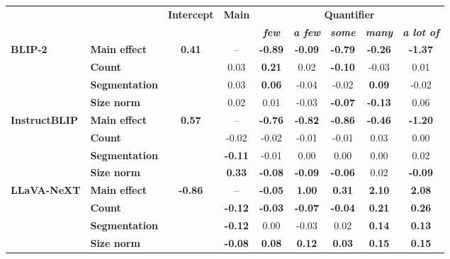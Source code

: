 \begin{table*}[t]
\centering
\small
\begin{tabular}{ll|c|c|ccccc}
\toprule
\multicolumn{2}{c|}{} 
    & \multirow{2}{*}{\textbf{Intercept}} 
    & \multirow{2}{*}{\textbf{Main}}
    & \multicolumn{5}{c}{\textbf{Quantifier}} \\
    &&&& \textbf{\textit{few}} & \textbf{\textit{a few}} & \textbf{\textit{some}} & \textbf{\textit{many}} & \textbf{\textit{a lot of}} \\
    \midrule

\multirow{4}{*}{\textbf{BLIP-2}}
    & \textbf{Main effect} & \multirow{4}{*}{\textbf{0.41}} & -- & \textbf{-0.89} & \textbf{-0.09} & \textbf{-0.79} & \textbf{-0.26} & \textbf{-1.37} \\
    & \textbf{Count}        && 0.03 & \textbf{0.21} & 0.02 & \textbf{-0.10} & -0.03 & 0.01 \\
    & \textbf{Segmentation} && 0.03 & \textbf{0.06} & -0.04 & -0.02 & \textbf{0.09} & -0.02 \\
    & \textbf{Size norm}    && 0.02 & 0.01 & -0.03 & \textbf{-0.07} & \textbf{-0.13} & 0.06 \\ 
    \midrule

\multirow{4}{*}{\textbf{InstructBLIP}}
    & \textbf{Main effect} & \multirow{4}{*}{\textbf{0.57}} & -- & \textbf{-0.76} & \textbf{-0.82} & \textbf{-0.86} & \textbf{-0.46} & \textbf{-1.20} \\
    & \textbf{Count}        && -0.02 & -0.02 & -0.01 & -0.01 & 0.03 & 0.00 \\
    & \textbf{Segmentation} && \textbf{-0.11} & -0.01 & 0.00 & 0.00 & 0.00 & 0.02 \\
    & \textbf{Size norm}    && \textbf{0.33} & \textbf{-0.08} & \textbf{-0.09} & \textbf{-0.06} & 0.02
        & \textbf{-0.09} \\
    \midrule

\multirow{4}{*}{\textbf{LLaVA-NeXT}}
    & \textbf{Main effect} & \multirow{4}{*}{\textbf{-0.86}} & -- & \textbf{-0.05} & \textbf{1.00} & \textbf{0.31} & \textbf{2.10} & \textbf{2.08} \\
    &\textbf{Count}         && \textbf{-0.12} & \textbf{-0.03} & \textbf{-0.07} & \textbf{-0.04} & \textbf{0.21} & \textbf{0.26} \\
    & \textbf{Segmentation} && \textbf{-0.12} & 0.00 & -0.03 & 0.02 & \textbf{0.14} & \textbf{0.13} \\
    & \textbf{Size norm}    && \textbf{-0.08} & \textbf{0.08} & \textbf{0.12} & \textbf{0.03} & \textbf{0.15} & \textbf{0.15} \\
    \midrule


\end{tabular}
\end{table*}
